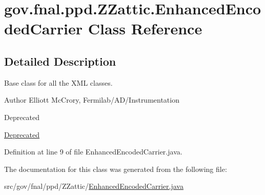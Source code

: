 \hypertarget{classgov_1_1fnal_1_1ppd_1_1ZZattic_1_1EnhancedEncodedCarrier}{\section{gov.\-fnal.\-ppd.\-Z\-Zattic.\-Enhanced\-Encoded\-Carrier Class Reference}
\label{classgov_1_1fnal_1_1ppd_1_1ZZattic_1_1EnhancedEncodedCarrier}
}


\subsection{Detailed Description}
Base class for all the X\-M\-L classes.

\begin{DoxyAuthor}{Author}
Elliott Mc\-Crory, Fermilab/\-A\-D/\-Instrumentation 
\end{DoxyAuthor}
\begin{DoxyRefDesc}{Deprecated}
\item[\hyperlink{deprecated__deprecated000015}{Deprecated}]\end{DoxyRefDesc}


Definition at line 9 of file Enhanced\-Encoded\-Carrier.\-java.



The documentation for this class was generated from the following file\-:\begin{DoxyCompactItemize}
\item 
src/gov/fnal/ppd/\-Z\-Zattic/\hyperlink{EnhancedEncodedCarrier_8java}{Enhanced\-Encoded\-Carrier.\-java}\end{DoxyCompactItemize}
